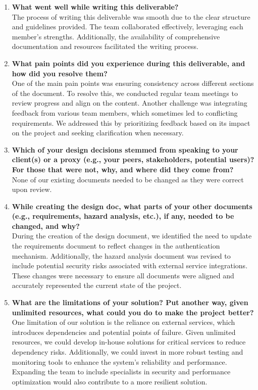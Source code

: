 \documentclass[12pt, titlepage]{article}
\begin{document}
\begin{itemize}
\begin{enumerate}
  \item \textbf{What went well while writing this deliverable?}   \\
  The process of writing this deliverable was smooth due to the clear structure and guidelines provided. The team collaborated effectively, leveraging each member's strengths. Additionally, the availability of comprehensive documentation and resources facilitated the writing process.

  \item \textbf{What pain points did you experience during this deliverable, and how did you resolve them?}  \\
  One of the main pain points was ensuring consistency across different sections of the document. To resolve this, we conducted regular team meetings to review progress and align on the content. Another challenge was integrating feedback from various team members, which sometimes led to conflicting requirements. We addressed this by prioritizing feedback based on its impact on the project and seeking clarification when necessary.

  \item \textbf{Which of your design decisions stemmed from speaking to your client(s) or a proxy (e.g., your peers, stakeholders, potential users)? For those that were not, why, and where did they come from?}  \\
  None of our existing documents needed to be changed as they were correct upon review.

  \item \textbf{While creating the design doc, what parts of your other documents (e.g., requirements, hazard analysis, etc.), if any, needed to be changed, and why?}  \\
  During the creation of the design document, we identified the need to update the requirements document to reflect changes in the authentication mechanism. Additionally, the hazard analysis document was revised to include potential security risks associated with external service integrations. These changes were necessary to ensure all documents were aligned and accurately represented the current state of the project.

  \item \textbf{What are the limitations of your solution? Put another way, given unlimited resources, what could you do to make the project better?}  \\
  One limitation of our solution is the reliance on external services, which introduces dependencies and potential points of failure. Given unlimited resources, we could develop in-house solutions for critical services to reduce dependency risks. Additionally, we could invest in more robust testing and monitoring tools to enhance the system's reliability and performance. Expanding the team to include specialists in security and performance optimization would also contribute to a more resilient solution.


\end{enumerate}
\end{itemize}
\end{document}
